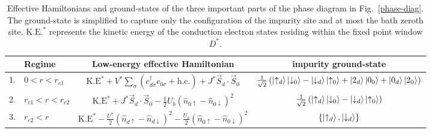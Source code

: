 \documentclass{iopart}
\begin{document}
\begin{table}[!htbp]
\centering
\begin{tabular}{|cl|c|c|}
\hline
& Regime & Low-energy effective Hamiltonian & impurity ground-state\\[5pt]
\hline
1. & \(0 < r < r_{c1}\) &  \(\text{K.E}^* + V^*\sum_\sigma \left( c^\dagger_{d\sigma}c_{0\sigma} + \text{h.c.}\right) + J^* \vec{S}_d\cdot\vec{S}_0\) & \(\frac{1}{\sqrt 2}\left(\ket{\uparrow_d}\ket{\downarrow_0} - \ket{\downarrow_d} \ket{\uparrow_0} + \ket{2_d}\ket{0_0} + \ket{0_d} \ket{2_0}\right)\)\\[10pt]
2. & \(r_{c1} < r < r_{c2}\) &  \(\text{K.E}^* + J^* \vec{S}_d\cdot\vec{S}_0 - \frac{1}{2}U_b \left(\hat n_{0 \uparrow} - \hat n_{0 \downarrow}\right)^2\) & \(\frac{1}{\sqrt 2}\left(\ket{\uparrow_d}\ket{\downarrow_0} - \ket{\downarrow_d} \ket{\uparrow_0}\right)\)\\[10pt]
3. & \(r_{c2} < r\) &  \(\text{K.E}^* - \frac{U^*}{2}\left(\hat n_{d \uparrow} - \hat n_{d \downarrow}\right)^2 - \frac{U_b}{2} \left(\hat n_{0 \uparrow} - \hat n_{0 \downarrow}\right)^2\) & \(\left\{ \ket{\uparrow_d},\ket{\downarrow_d}\right\}\)\\[5pt]
\hline
\end{tabular}
\caption{Effective Hamiltonians and ground-states of the three important parts of the phase diagram in Fig.~\eqref{phase-diag}. The ground-state is simplified to capture only the configuration of the impurity site and at most the bath zeroth site. \(\text{K.E.}^*\) represents the kinetic energy of the conduction electron states residing within the fixed point window \(D^*\).}
\label{phases-table}
\end{table}
\end{document}
